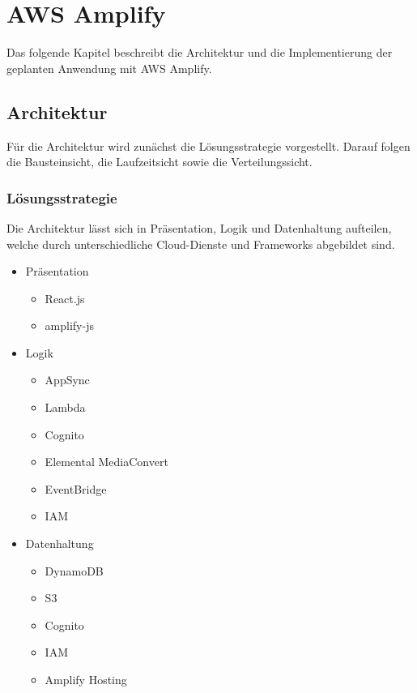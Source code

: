 \chapter{AWS Amplify}

Das folgende Kapitel beschreibt die Architektur und die Implementierung der geplanten Anwendung mit AWS Amplify.

\section{Architektur}

Für die Architektur wird zunächst die Lösungsstrategie vorgestellt. Darauf folgen die Bausteinsicht, die Laufzeitsicht sowie die Verteilungssicht.

\subsection{Lösungsstrategie}

Die Architektur lässt sich in Präsentation, Logik und Datenhaltung aufteilen, welche durch unterschiedliche Cloud-Dienste und Frameworks abgebildet sind.
\begin{itemize}
  \item Präsentation
    \begin{itemize}
      \item React.js
      \item amplify-js
    \end{itemize}
  \item Logik
    \begin{itemize}
      \item AppSync
      \item Lambda
      \item Cognito
      \item Elemental MediaConvert
      \item EventBridge
      \item IAM
    \end{itemize}
  \item Datenhaltung
    \begin{itemize}
      \item DynamoDB
      \item S3
      \item Cognito
      \item IAM
      \item Amplify Hosting
    \end{itemize}
\end{itemize}

